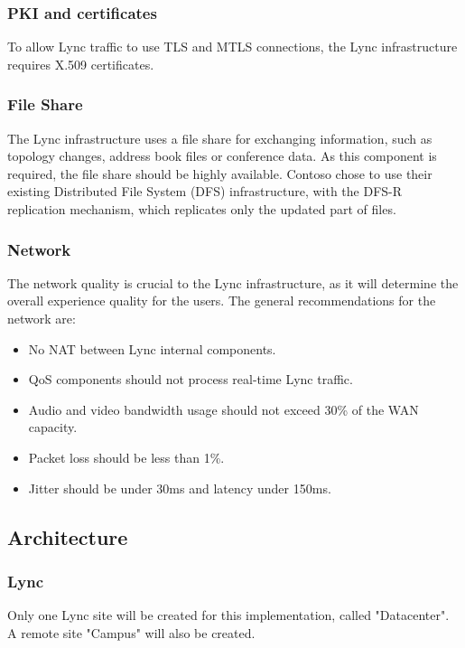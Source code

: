 	\subsubsection{PKI and certificates}
		To allow Lync traffic to use TLS and MTLS connections, the Lync infrastructure requires X.509 certificates.	
		
	\subsubsection{File Share}
		The Lync infrastructure uses a file share for exchanging information, such as topology changes, address book files or conference data. As this component is required, the file share should be highly available. Contoso chose to use their existing Distributed File System (DFS) infrastructure, with the DFS-R replication mechanism, which replicates only the updated part of files.
		
		
	\subsubsection{Network}
		The network quality is crucial to the Lync infrastructure, as it will determine the overall experience quality for the users. The general recommendations for the network are:
		\begin{itemize}
			\item No NAT between Lync internal components.
			\item QoS components should not process real-time Lync traffic.
			\item Audio and video bandwidth usage should not exceed 30\% of the WAN capacity.
			\item Packet loss should be less than 1\%.
			\item Jitter should be under 30ms and latency under 150ms.
		\end{itemize}
		
		
		
		
		


\subsection{Architecture}

	\subsubsection{Lync}
	Only one Lync site will be created for this implementation, called "Datacenter". A remote site "Campus" will also be created.
	
